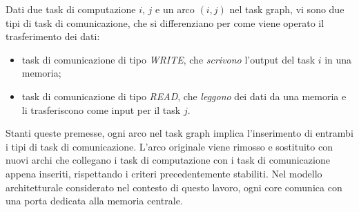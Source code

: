 Dati due task di computazione $i$, $j$ e un 
arco $(i,j)$ nel task graph, vi sono due tipi di task di comunicazione, che si 
differenziano per come viene operato il trasferimento dei dati:
\begin{itemize}
 \item task di comunicazione di tipo \emph{WRITE}, che \emph{scrivono} 
l'output del task $i$ in una memoria;
 \item task di comunicazione di tipo \emph{READ}, che \emph{leggono} dei dati 
da una memoria e li trasferiscono come input per il task $j$. 
\end{itemize}
Stanti queste premesse, ogni arco nel task graph implica l'inserimento di 
entrambi i tipi di task di comunicazione. L'arco originale viene rimosso e 
sostituito con nuovi archi che collegano i task di computazione con i task di 
comunicazione appena inseriti, rispettando i criteri precedentemente stabiliti.
Nel modello architetturale considerato nel contesto di questo lavoro, ogni core
comunica con una porta dedicata alla memoria centrale.


